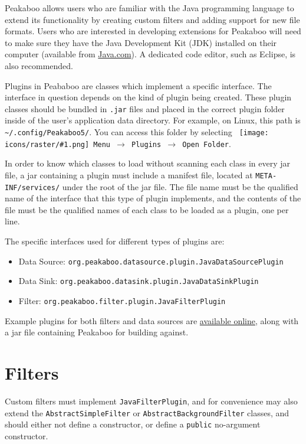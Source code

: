 \documentclass[article,twoside,11pt]{report}
\newcommand{\command}[1]{\texttt{#1}}
\newcommand{\icon}[1]{\texttt{[image: icons/raster/\#1.png]}}
\newcommand{\button}[2]{\ \command{\icon{#1} #2}}
\newcommand{\menu}[0]{$\rightarrow$}
\newcommand{\file}[1]{\command{#1}}
\newcommand{\code}[1]{\command{#1}}
\newcommand{\class}[1]{{\color{violet} \code{#1}}}
\newcommand{\tocsection}[1]{\section*{#1}\addcontentsline{toc}{section}{#1}}
\begin{document}
Peakaboo allows users who are familiar with the Java programming language to extend its functionality by creating custom filters and adding support for new file formats. Users who are interested in developing extensions for Peakaboo will need to make sure they have the Java Development Kit (JDK) installed on their computer (available from \href{http://java.com}{Java.com}). A dedicated code editor, such as Eclipse, is also recommended. 

Plugins in Peababoo are classes which implement a specific interface. The interface in question depends on the kind of plugin being created. These plugin classes should be bundled in \file{.jar} files and placed in the correct plugin folder inside of the user's application data directory. For example, on Linux, this path is \file{\textasciitilde/.config/Peakaboo5/}. You can access this folder by selecting \command{\button{main-menu}{Menu} \menu\ Plugins \menu\ Open Folder}.

In order to know which classes to load without scanning each class in every jar file, a jar containing a plugin must include a manifest file, located at \file{META-INF/services/} under the root of the jar file. The file name must be the qualified name of the interface that this type of plugin implements, and the contents of the file must be the qualified names of each class to be 
loaded as a plugin, one per line.

The specific interfaces used for different types of plugins are:
\begin{itemize}[topsep=4pt,itemsep=1pt,partopsep=0pt, parsep=0pt]
\item Data Source: \class{org.peakaboo.datasource.plugin.JavaDataSourcePlugin}
\item Data Sink: \class{org.peakaboo.datasink.plugin.JavaDataSinkPlugin}
\item Filter: \class{org.peakaboo.filter.plugin.JavaFilterPlugin}
\end{itemize}

Example plugins for both filters and data sources are \href{https://github.com/nsherry4/PeakabooPlugins/}{available online}, along with a jar file containing Peakaboo for building against.

\tocsection{Filters}

Custom filters must implement \class{JavaFilterPlugin}, and for convenience may also extend the \class{AbstractSimpleFilter} or \class{AbstractBackgroundFilter} classes, and should either not define a constructor, or define a \code{public} no-argument constructor.
\end{document}
